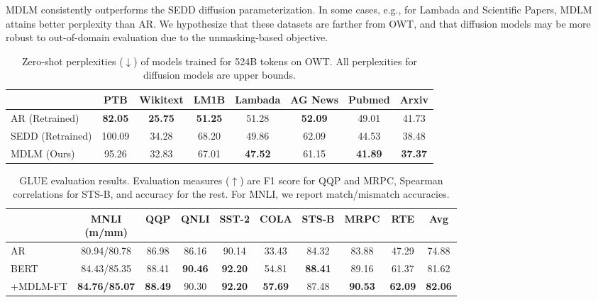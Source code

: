 \documentclass{article} %
\def\algo{MDLM}
\def\owt{OWT}
\begin{document}
{\algo{} consistently outperforms the SEDD diffusion parameterization.
In some cases, e.g., for Lambada and Scientific Papers, \algo{} attains better perplexity than AR.
We hypothesize that these datasets are farther from OWT, and that diffusion models may be more robust to out-of-domain evaluation due to the unmasking-based objective.

\begin{table}[t!]
\caption{Zero-shot perplexities ($\downarrow$) of models trained for 524B tokens on \owt{}.
All perplexities for diffusion models are upper bounds.
}
\label{zeroshot-ppl}
\centering
\begin{tabular}{lccccccc}
\toprule
& PTB & Wikitext & LM1B & Lambada  & AG News & Pubmed & Arxiv\\
\midrule
AR (Retrained) &\textbf{82.05} & \textbf{25.75} & \textbf{51.25} & 51.28 & \textbf{52.09} & 49.01 & 41.73\\
\midrule
SEDD (Retrained) & 100.09 & 34.28 & 68.20& 49.86 & 62.09 & 44.53 & 38.48\\
\algo{} (Ours)  & 95.26 & 32.83 & 67.01& \textbf{47.52} & 61.15 & \textbf{41.89} & \textbf{37.37}\\

\bottomrule
\end{tabular}
\end{table}

\begin{table}[t!]
\caption{GLUE evaluation results.
Evaluation measures ($\uparrow$) are F1 score for QQP and MRPC, Spearman correlations for STS-B, and accuracy for the rest.
For MNLI, we report match/mismatch accuracies.
}
  \label{tbl:glue}
\centering
\footnotesize
\begin{tabular}{lccccccccc}
\toprule
& \shortstack{MNLI\\(m/mm)} & QQP & QNLI & SST-2  & COLA & STS-B & MRPC & RTE & Avg\\
\midrule
AR & 80.94/80.78 & 86.98 & 86.16 & 90.14 & 33.43  &84.32  & 83.88 &47.29  & 74.88\\
BERT & 84.43/85.35 & 88.41 & \bf{90.46} & \bf{92.20} & 54.81 & \bf{88.41} & 89.16 & 61.37 & 81.62\\
+\algo{}-FT  & \bf{84.76/85.07} & \bf{88.49} & 90.30 & \bf{92.20} & \bf{57.69} & 87.48 & \bf{90.53} & \bf{62.09} & \bf{82.06}\\
\bottomrule
\end{tabular}
\end{table}

}
\end{document}
